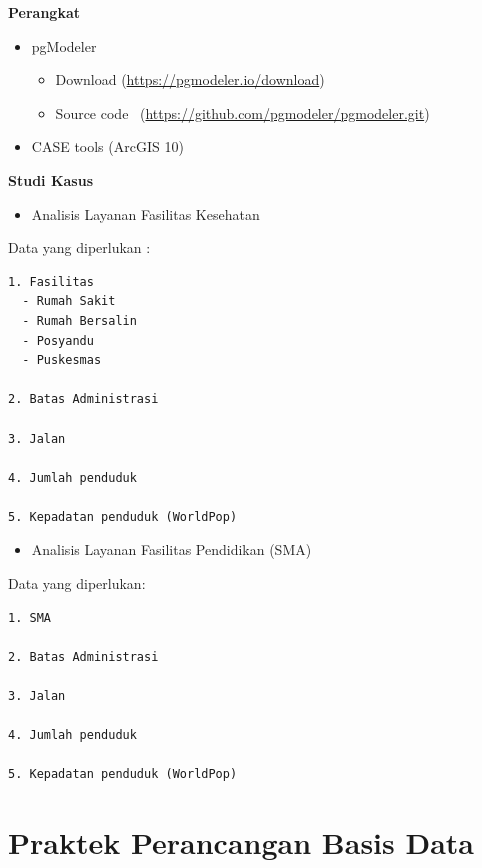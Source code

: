 \documentclass[]{book}
\providecommand{\tightlist}{%
  \setlength{\itemsep}{0pt}\setlength{\parskip}{0pt}}
\begin{document}
\textbf{Perangkat}

\begin{itemize}
\tightlist
\item
  pgModeler

  \begin{itemize}
  \tightlist
  \item
    Download (\url{https://pgmodeler.io/download})
  \item
    Source code ~(\url{https://github.com/pgmodeler/pgmodeler.git})
  \end{itemize}
\item
  CASE tools (ArcGIS 10)
\end{itemize}

\textbf{Studi Kasus}

\begin{itemize}
\tightlist
\item
  Analisis Layanan Fasilitas Kesehatan
\end{itemize}

Data yang diperlukan :

\begin{verbatim}
1. Fasilitas 
  - Rumah Sakit
  - Rumah Bersalin
  - Posyandu
  - Puskesmas

2. Batas Administrasi

3. Jalan

4. Jumlah penduduk

5. Kepadatan penduduk (WorldPop)
\end{verbatim}

\begin{itemize}
\tightlist
\item
  Analisis Layanan Fasilitas Pendidikan (SMA)
\end{itemize}

Data yang diperlukan:

\begin{verbatim}
1. SMA

2. Batas Administrasi

3. Jalan

4. Jumlah penduduk

5. Kepadatan penduduk (WorldPop)
\end{verbatim}

\hypertarget{praktek-perancangan-basis-data}{%
\section{Praktek Perancangan Basis Data}\label{praktek-perancangan-basis-data}}
\end{document}
